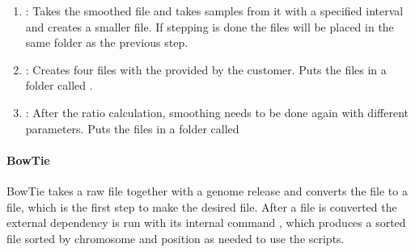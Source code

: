 \begin{enumerate}
\item {}: Takes the smoothed  file and takes samples from it
with a specified interval and creates a smaller  file. If stepping is done the files will be placed in the same folder as the previous step.

\item {}: Creates four  files with the
provided by the customer. Puts the files in a folder called .

\item {}: After the ratio calculation, smoothing needs to be done
again with different parameters. Puts the files in a folder called
\end{enumerate}



\paragraph{BowTie}
BowTie takes a raw  file together with a genome release and converts the  file to a  file, which is the first step to make the desired  file.
After a  file is converted the external dependency  is run with its internal command , which produces a sorted  file sorted by chromosome and position as needed to use the scripts.
